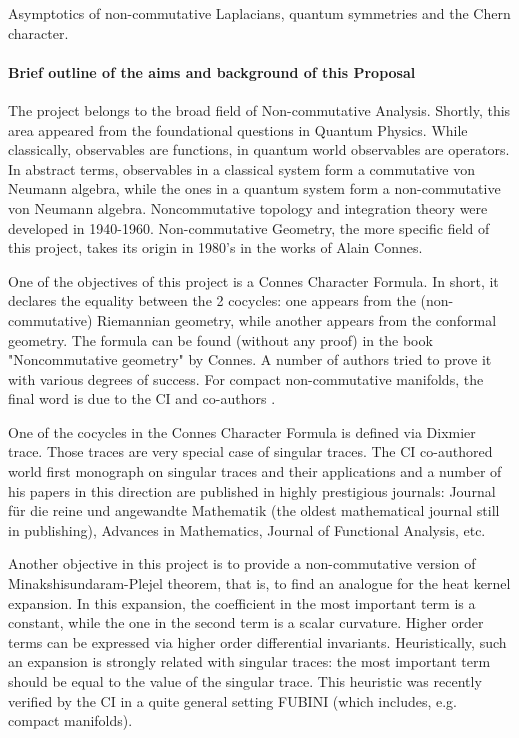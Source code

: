\documentclass[12pt]{article}
\newcommand{\archeading}[1]{\vspace{.3cm} \noindent{\bfseries #1} \vspace{.1cm}   }
\begin{document}
\parindent=20pt
\pagestyle{empty}
\newpage

\archeading{Project Title} Asymptotics of non-commutative Laplacians, quantum symmetries and the Chern character.

\bigskip\archeading{Aims and Background}


\paragraph*{Brief outline of the aims and background of this Proposal} 

The project belongs to the broad field of Non-commutative Analysis. Shortly, this area appeared from the foundational questions in Quantum Physics. While classically, observables are functions, in quantum world observables are operators. In abstract terms, observables in a classical system form a commutative von Neumann algebra, while the ones in a quantum system form a non-commutative von Neumann algebra. Noncommutative topology and integration theory were developed in 1940-1960. Non-commutative Geometry, the more specific field of this project, takes its origin in 1980's in the works of Alain Connes.

One of the objectives of this project is a Connes Character Formula. In short, it declares the equality between the 2 cocycles: one appears from the (non-commutative) Riemannian geometry, while another appears from the conformal geometry. The formula can be found (without any proof) in the book "Noncommutative geometry" by Connes. A number of authors tried to prove it with various degrees of success. For compact non-commutative manifolds, the final word is due to the CI and co-authors \cite{CRSZ}.

One of the cocycles in the Connes Character Formula is defined via Dixmier trace. Those traces are very special case of singular traces. The CI co-authored world first monograph on singular traces and their applications and a number of his papers in this direction are published in highly prestigious journals: Journal für die reine und angewandte Mathematik (the oldest mathematical journal still in publishing), Advances in Mathematics, Journal of Functional Analysis, etc.

Another objective in this project is to provide a non-commutative version of Minakshisundaram-Plejel theorem, that is, to find an analogue for the heat kernel expansion. In this expansion, the coefficient in the most important term is a constant, while the one in the second term is a scalar curvature. Higher order terms can be expressed via higher order differential invariants. Heuristically, such an expansion is strongly related with singular traces: the most important term should be equal to the value of the singular trace. This heuristic was recently verified by the CI in a quite general setting FUBINI (which includes, e.g. compact manifolds).
\end{document}

